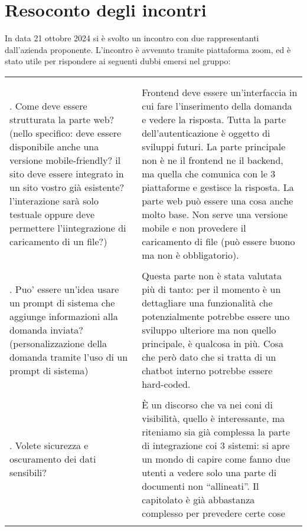 \section{Resoconto degli incontri}

In data 21 ottobre 2024 si è svolto un incontro con due rappresentanti dall'azienda proponente.
L'incontro è avvenuto tramite piattaforma zoom, ed è stato utile per rispondere ai seguenti dubbi emersi nel gruppo:

\begingroup
\renewcommand{\ni}{\noindent}

  \vspace{0.5cm}

  \begin{tabular}{>{\justifying\arraybackslash}p{} >{\justifying\arraybackslash}p{}}
      \multicolumn{1}{c}{\textbf{Domande}} & \multicolumn{1}{c}{\textbf{Risposte}} \\ \\
      
      \ni 1. Come deve essere strutturata la parte web? (nello specifico: deve essere disponibile anche una versione mobile-friendly? il sito deve essere 
      integrato in un sito vostro già esistente?l'interazione sarà solo testuale oppure deve permettere l'iintegrazione di caricamento di un file?)
      & \ni Frontend deve essere un’interfaccia in cui fare l’inserimento della domanda e vedere la risposta.
      Tutta la parte dell’autenticazione è oggetto di sviluppi futuri.
      La parte principale non è ne il frontend ne il backend, ma quella che comunica con le 3 piattaforme e gestisce la risposta. La parte web può essere 
      una cosa anche molto base.
      Non serve una versione mobile e non provedere il caricamento di file (può essere buono ma non è obbligatorio). \\ \\
      
      \ni 2. Puo’ essere un’idea usare un prompt di sistema che aggiunge informazioni alla domanda inviata? (personalizzazione della domanda tramite l'uso 
      di un prompt di sistema)
      & \ni Questa parte non è stata valutata più di tanto: per il momento è un dettagliare una funzionalità che potenzialmente potrebbe essere uno
      sviluppo ulteriore ma non quello principale, è qualcosa in più. Cosa che però dato che si tratta di un chatbot interno potrebbe essere hard-coded. \\ \\
      
      \ni 3. Volete sicurezza e oscuramento dei dati sensibili?
      & \ni È un discorso che va nei coni di visibilità, quello è interessante, ma riteniamo sia già complessa la parte di integrazione coi 3 sistemi:
      si apre un mondo di capire come fanno due utenti a vedere solo una parte di documenti non “allineati”.
      Il capitolato è già abbastanza complesso per prevedere certe cose \\ \\


\end{tabular}
